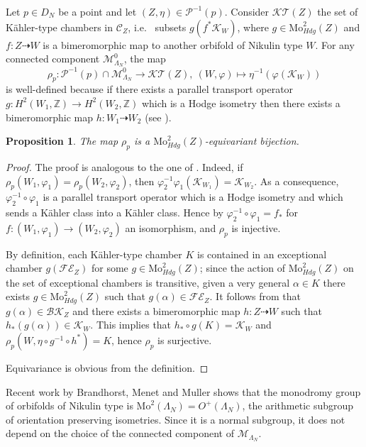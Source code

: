 \documentclass{amsart}
\newtheorem{prop}[thm]{Proposition}
\theoremstyle{definition}
\numberwithin{equation}{section}
\numberwithin{equation}{section} \theoremstyle{definition}
\begin{document}
Let $p\in D_N$ be a point and let $(Z,\eta)\in\mathcal{P}^{-1}(p)$. Consider $\mathcal{KT}(Z)$ the set of K\"ahler-type chambers in $\mathcal{C}_Z$, i.e.~ subsets $g(f^*\mathcal{K}_W)$, where $g\in\mathrm{Mo}^2_{Hdg}(Z)$ and $f:Z\dashrightarrow W$ is a bimeromorphic map to another orbifold of Nikulin type $W$. For any connected component $\mathcal{M}^0_{\Lambda_N}$, the map
\[
\rho_p: \mathcal{P}^{-1}(p)\cap \mathcal{M}^0_{\Lambda_N}\rightarrow \mathcal{KT}(Z),\ (W,\varphi)\mapsto \eta^{-1}(\varphi(\mathcal{K}_W))
\]
is well-defined because if there exists a parallel transport operator $g:H^2(W_1,\mathbb{Z})\rightarrow H^2(W_2,\mathbb{Z})$ which is a Hodge isometry then there exists a bimeromorphic map $h:W_1\dashrightarrow W_2$ (see \cite[Corollary 5.11]{MenetTorelli}).
\begin{prop}\label{prop:equivariant-bijection}
The map $\rho_p$ is a $\mathrm{Mo}^2_{Hdg}(Z)$-equivariant bijection.
\end{prop}
\begin{proof}
The proof is analogous to the one of \cite[Proposition 5.14]{MarkmanTorelli}. Indeed, if $\rho_p(W_1,\varphi_1)=\rho_p(W_2,\varphi_2)$, then $\varphi_2^{-1}\varphi_1(\mathcal{K}_{W_1})=\mathcal{K}_{W_2}$. As a consequence, $\varphi_2^{-1}\circ\varphi_1$ is a parallel transport operator which is a Hodge isometry and which sends a K\"ahler class into a K\"ahler class. Hence by \cite[Theorem 1.1]{MenetRiess} $ \varphi_2^{-1}\circ\varphi_1=f_*$ for $f:(W_1,\varphi_1)\rightarrow (W_2,\varphi_2)$ an isomorphism, and $\rho_p$ is injective.

By definition, each K\"ahler-type chamber $K$ is contained in an exceptional chamber $g(\mathcal{FE}_Z)$ for some $g\in\mathrm{Mo}^2_{Hdg}(Z)$; since the action of $\mathrm{Mo}_{Hdg}^2(Z)$ on the set of exceptional chambers is transitive, given a very general $\alpha\in K$ there exists $g\in\mathrm{Mo}^2_{Hdg}(Z)$ such that $g(\alpha)\in \mathcal{FE}_Z$. It follows from \cite[Proposition 4.18]{MenetRiess} that $g(\alpha)\in\mathcal{BK}_Z$ and there exists a bimeromorphic map $h:Z\dashrightarrow W$ such that $h_*(g(\alpha))\in\mathcal{K}_W$. This implies that $h_*\circ g(K)=\mathcal{K}_W$ and $\rho_p(W, \eta\circ g^{-1}\circ h^*)=K$, hence $\rho_p$ is surjective. 

Equivariance is obvious from the definition. \end{proof}

Recent work by Brandhorst, Menet and Muller \cite[Theorem 1.1]{BMM} shows that the monodromy group of orbifolds of Nikulin type is $\mathrm{Mo}^2(\Lambda_N)=O^+(\Lambda_N)$, the arithmetic subgroup of orientation preserving isometries. Since it is a normal subgroup, it does not depend on the choice of the connected component of $\mathcal{M}_{\Lambda_N}$.
\end{document}
